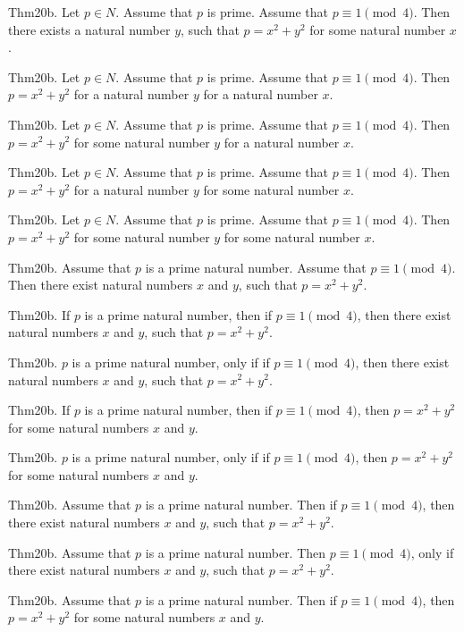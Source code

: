 \documentclass{article}
\begin{document}
Thm20b. Let $p \in N$. Assume that $p$ is prime. Assume that $p \equiv 1 \pmod{ 4}$. Then there exists a natural number $y$, such that $p = x ^{ 2}+ y ^{ 2}$ for some natural number $x$.

Thm20b. Let $p \in N$. Assume that $p$ is prime. Assume that $p \equiv 1 \pmod{ 4}$. Then $p = x ^{ 2}+ y ^{ 2}$ for a natural number $y$ for a natural number $x$.

Thm20b. Let $p \in N$. Assume that $p$ is prime. Assume that $p \equiv 1 \pmod{ 4}$. Then $p = x ^{ 2}+ y ^{ 2}$ for some natural number $y$ for a natural number $x$.

Thm20b. Let $p \in N$. Assume that $p$ is prime. Assume that $p \equiv 1 \pmod{ 4}$. Then $p = x ^{ 2}+ y ^{ 2}$ for a natural number $y$ for some natural number $x$.

Thm20b. Let $p \in N$. Assume that $p$ is prime. Assume that $p \equiv 1 \pmod{ 4}$. Then $p = x ^{ 2}+ y ^{ 2}$ for some natural number $y$ for some natural number $x$.

Thm20b. Assume that $p$ is a prime natural number. Assume that $p \equiv 1 \pmod{ 4}$. Then there exist natural numbers $x$ and $y$, such that $p = x ^{ 2}+ y ^{ 2}$.

Thm20b. If $p$ is a prime natural number, then if $p \equiv 1 \pmod{ 4}$, then there exist natural numbers $x$ and $y$, such that $p = x ^{ 2}+ y ^{ 2}$.

Thm20b. $p$ is a prime natural number, only if if $p \equiv 1 \pmod{ 4}$, then there exist natural numbers $x$ and $y$, such that $p = x ^{ 2}+ y ^{ 2}$.

Thm20b. If $p$ is a prime natural number, then if $p \equiv 1 \pmod{ 4}$, then $p = x ^{ 2}+ y ^{ 2}$ for some natural numbers $x$ and $y$.

Thm20b. $p$ is a prime natural number, only if if $p \equiv 1 \pmod{ 4}$, then $p = x ^{ 2}+ y ^{ 2}$ for some natural numbers $x$ and $y$.

Thm20b. Assume that $p$ is a prime natural number. Then if $p \equiv 1 \pmod{ 4}$, then there exist natural numbers $x$ and $y$, such that $p = x ^{ 2}+ y ^{ 2}$.

Thm20b. Assume that $p$ is a prime natural number. Then $p \equiv 1 \pmod{ 4}$, only if there exist natural numbers $x$ and $y$, such that $p = x ^{ 2}+ y ^{ 2}$.

Thm20b. Assume that $p$ is a prime natural number. Then if $p \equiv 1 \pmod{ 4}$, then $p = x ^{ 2}+ y ^{ 2}$ for some natural numbers $x$ and $y$.
\end{document}
